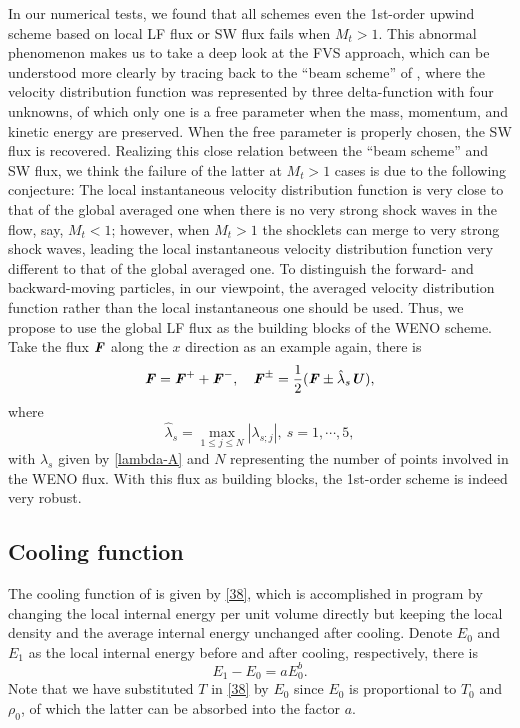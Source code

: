 \documentclass[review]{elsarticle}
\newcommand{\fr}{\frac}
\newcommand{\er}{\eqref}
\newcommand{\pF}{\textbf{\emph{F}}}
\newcommand{\pU}{\textbf{\emph{U}}}
\begin{document}
In our numerical tests, we found that all schemes even the 1st-order upwind scheme based on local LF flux or SW flux fails when $M_t > 1$. This abnormal phenomenon makes us to take a deep look at the FVS approach, which can be understood more clearly by tracing back to the ``beam scheme'' of \citet{Sanders1974}, where the velocity distribution function was represented by three delta-function with four unknowns, of which only one is a free parameter when the mass, momentum, and kinetic energy are preserved. When the free parameter is properly chosen, the SW flux is recovered. Realizing this close relation between the ``beam scheme'' and SW flux, we think the failure of the latter at $M_t>1$ cases is due to the following conjecture: The local instantaneous velocity distribution function is very close to that of the global averaged one when there is no very strong shock waves in the flow, say, $M_t < 1$; however, when $M_t > 1$ the shocklets can merge to very strong shock waves, leading the local instantaneous velocity distribution function very different to that of the global averaged one. To distinguish the forward- and backward-moving particles, in our viewpoint, the averaged velocity distribution function rather than the local instantaneous one should be used. Thus, we propose to use the global LF flux as the building blocks of the WENO scheme. Take the flux $\pF$ along the $x$ direction as an example again, there is
\begin{equation}\label{F-pm-LF}
  \pF = \pF^+ + \pF^-, \quad
  \pF^\pm = \fr{1}{2} (\pF \pm \hat \lambda_s \pU),
\end{equation}
where
\begin{equation}\label{F-pm-c-3}
  \hat \lambda_s = \max_{1\le j \le N} |\lambda_{s; j}|, \ s = 1, \cdots, 5,
\end{equation}
with $\lambda_{s}$ given by \er{lambda-A} and $N$ representing the number of points involved in the WENO flux. With this flux as building blocks, the 1st-order scheme is indeed very robust.


\subsection{Cooling function}\label{sec.cooling}

The cooling function of \citet{Wang2010} is given by \er{38}, which is accomplished in program by changing the local internal energy per unit volume directly but keeping the local density and the average internal energy unchanged after cooling. Denote $E_0$ and $E_1$ as the local internal energy before and after cooling, respectively, there is
\begin{equation}\label{38-1}
  E_1 - E_0 = a E_0^b.
\end{equation}
Note that we have substituted $T$ in \er{38} by $E_0$ since $E_0$ is proportional to $T_0$ and $\rho_0$, of which the latter can be absorbed into the factor $a$.
\end{document}
